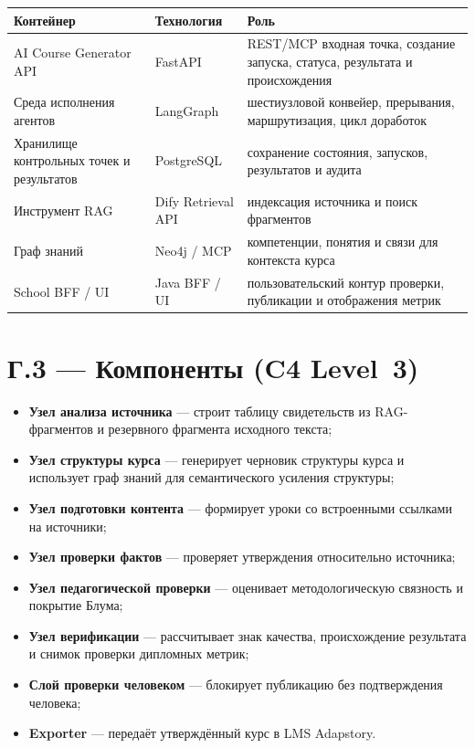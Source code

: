 \begin{center}
  \centering
  \label{tab:c4-containers}
  \begingroup
  \small
  \setlength{\tabcolsep}{3pt}
  \renewcommand{\arraystretch}{1.0}
  \begin{tabular}{|P{4.0cm}|P{3.2cm}|P{5.0cm}|}
  \hline
  \textbf{Контейнер} & \textbf{Технология} & \textbf{Роль} \\
  \hline
  AI Course Generator API & FastAPI & REST/MCP входная точка, создание запуска, статуса, результата и происхождения \\
  \hline
  Среда исполнения агентов & LangGraph & шестиузловой конвейер, прерывания, маршрутизация, цикл доработок \\
  \hline
  Хранилище контрольных точек и результатов & PostgreSQL & сохранение состояния, запусков, результатов и аудита \\
  \hline
  Инструмент RAG & Dify Retrieval API & индексация источника и поиск фрагментов \\
  \hline
  Граф знаний & Neo4j / MCP & компетенции, понятия и связи для контекста курса \\
  \hline
  School BFF / UI & Java BFF / UI & пользовательский контур проверки, публикации и отображения метрик \\
  \hline
  \end{tabular}
  \endgroup
\end{center}

\section*{Г.3 — Компоненты (C4 Level~3)}

\begin{itemize}[itemsep=0pt, topsep=0pt]
  \item \textbf{Узел анализа источника} — строит таблицу свидетельств из RAG-фрагментов
    и резервного фрагмента исходного текста;
  \item \textbf{Узел структуры курса} — генерирует черновик структуры курса и использует
    граф знаний для семантического усиления структуры;
  \item \textbf{Узел подготовки контента} — формирует уроки со встроенными ссылками на источники;
  \item \textbf{Узел проверки фактов} — проверяет утверждения относительно источника;
  \item \textbf{Узел педагогической проверки} — оценивает методологическую связность и покрытие Блума;
  \item \textbf{Узел верификации} — рассчитывает знак качества, происхождение результата и снимок проверки дипломных метрик;
  \item \textbf{Слой проверки человеком} — блокирует публикацию без подтверждения человека;
  \item \textbf{Exporter} — передаёт утверждённый курс в LMS Adapstory.
\end{itemize}
